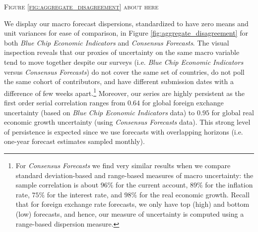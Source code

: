 \begin{center}
	\textsc{Figure \ref{fig:aggregate_disagreement} about here}
\end{center}

We display our macro forecast dispersions, standardized to have zero means and unit variances for ease of comparison, in Figure \ref{fig:aggregate_disagreement} for both \emph{Blue Chip Economic Indicators} and \emph{Consensus Forecasts}. The visual inspection reveals that our proxies of uncertainty on the same macro variable tend to move together despite our surveys (i.e. \emph{Blue Chip Economic Indicators} versus \emph{Consensus Forecasts}) do not cover the same set of countries, do not poll the same cohort of contributors, and have different submission dates with a difference of few weeks apart.\footnote{For \emph{Consensus Forecasts} we find very similar results when we compare standard deviation-based and range-based measures of macro uncertainty: the sample correlation is about $96\%$ for the current account, $89\%$ for the inflation rate, $75\%$ for the interest rate, and $98\%$ for the real economic growth. Recall that for foreign exchange rate forecasts, we only have top (high) and bottom (low) forecasts, and hence, our measure of uncertainty is computed using a range-based dispersion measure.} Moreover, our series are highly persistent as the first order serial correlation ranges from $0.64$ for global foreign exchange uncertainty (based on \emph{Blue Chip Economic Indicators} data) to $0.95$ for global real economic growth uncertainty (using \emph{Consensus Forecasts} data). This strong level of persistence is expected since we use forecasts with overlapping horizons (i.e. one-year forecast estimates sampled monthly).

